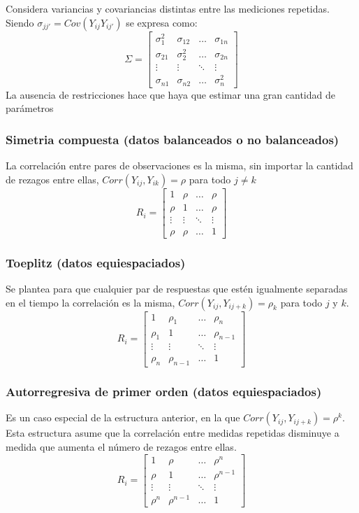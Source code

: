 \documentclass[spanish]{article}
\numberwithin{figure}{subsection}
\numberwithin{equation}{subsection}
\numberwithin{table}{subsection}
\begin{document}
Considera variancias y covariancias distintas entre las mediciones repetidas.
Siendo $\sigma_{jj'} = Cov(Y_{ij}Y_{ij'})$ se expresa como:
\[
\varSigma = 
\begin{bmatrix}
	\sigma_{1}^2 & \sigma_{12}  & \dots  & \sigma_{1n} \\
	\sigma_{21}  & \sigma_{2}^2 & \dots  & \sigma_{2n} \\
	\vdots 		 & \vdots	    & \ddots & \vdots	   \\
	\sigma_{n1}  & \sigma_{n2}  & \dots  & \sigma_{n}^2
\end{bmatrix}
\]
La ausencia de restricciones hace que haya que estimar una gran cantidad de parámetros

\subsubsection{Simetria compuesta (datos balanceados o no balanceados)}

La correlación entre pares de observaciones es la misma, sin importar la cantidad de rezagos entre ellas,
$Corr(Y_{ij}, Y_{ik}) = \rho $ para todo $j \neq k$
\[
R_i =
\begin{bmatrix}
	1      & \rho   & \dots  & \rho \\
	\rho   & 1      & \dots  & \rho \\
	\vdots & \vdots	& \ddots & \vdots \\
	\rho   & \rho   & \dots  & 1
\end{bmatrix}
\]

\subsubsection{Toeplitz (datos equiespaciados)}
Se plantea para que cualquier par de respuestas que estén igualmente separadas en el tiempo la correlación es la misma,
$Corr(Y_{ij},Y_{ij+k}) = \rho_{k}$ para todo $j$ y $k$.
\[
R_i =
\begin{bmatrix}
	1      & \rho_1 	& \dots  & \rho_n \\
	\rho_1 & 1     		& \dots  & \rho_{n-1} \\
	\vdots & \vdots		& \ddots & \vdots \\
	\rho_n & \rho_{n-1} & \dots  & 1
\end{bmatrix}
\]

\subsubsection{Autorregresiva de primer orden (datos equiespaciados)}
Es un caso especial de la estructura anterior, en la que $Corr(Y_{ij}, Y_{ij+k}) = \rho^k$. Esta estructura asume que la
correlación entre medidas repetidas disminuye a medida que aumenta el número de rezagos entre ellas.
\[
R_i =
\begin{bmatrix}
	1      & \rho 	    & \dots  & \rho^n \\
	\rho   & 1     		& \dots  & \rho^{n-1} \\
	\vdots & \vdots		& \ddots & \vdots \\
	\rho^n & \rho^{n-1} & \dots  & 1
\end{bmatrix}
\]
\end{document}
